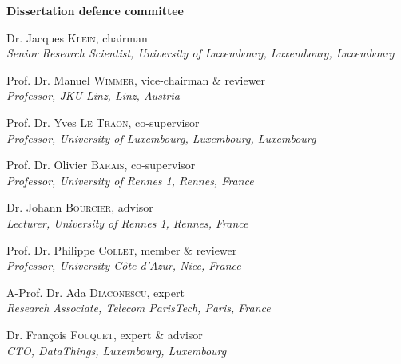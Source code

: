 \documentclass[12pt, twoside]{book}
\begin{document}
\begin{adjustwidth*}{1em}{1em}

\noindent
\textbf{\large Dissertation defence committee}

\vspace{0.2cm}
\noindent
Dr. Jacques \textsc{Klein}, chairman\\
{\small \emph{Senior Research Scientist, University of Luxembourg, Luxembourg, Luxembourg}}

\vspace{0.2cm}
\noindent
Prof. Dr. Manuel \textsc{Wimmer}, vice-chairman \& reviewer\\
{\small \emph{Professor, JKU Linz, Linz, Austria}}

\vspace{0.2cm}
\noindent
Prof. Dr. Yves \textsc{Le Traon}, co-supervisor\\
{\small \emph{Professor, University of Luxembourg, Luxembourg, Luxembourg}}

\vspace{0.2cm}
\noindent
Prof. Dr. Olivier \textsc{Barais}, co-supervisor\\
{\small \emph{Professor, University of Rennes 1, Rennes, France}}

\vspace{0.2cm}
\noindent
Dr. Johann \textsc{Bourcier}, advisor\\
{\small \emph{Lecturer, University of Rennes 1, Rennes, France}}   

\vspace{0.2cm}
\noindent
Prof. Dr. Philippe \textsc{Collet}, member \& reviewer\\
{\small \emph{Professor, University Côte d'Azur, Nice, France}}

\vspace{0.2cm}
\noindent
A-Prof. Dr. Ada \textsc{Diaconescu}, expert\\
{\small \emph{Research Associate, Telecom ParisTech, Paris, France}}   

\vspace{0.2cm}
\noindent
Dr.  Fran\c{c}ois \textsc{Fouquet}, expert \& advisor\\
{\small \emph{CTO, DataThings, Luxembourg, Luxembourg}}   

\end{adjustwidth*}
\end{document}
